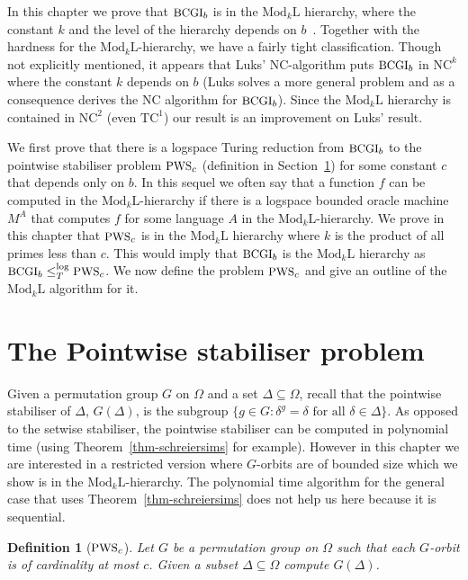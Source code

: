 \documentclass[11pt]{madras}%
\newtheorem{definition}[theorem]{Definition}
\theoremstyle{remark}
\newcommand{\ModkL}[1]{{\ensuremath{\mathrm{Mod}_{#1}\mathrm{L}}}}
\newcommand{\ProblemFont}[1]{{\ensuremath{\textrm{\small #1}}}}
\newcommand{\pointwise}[2]{{\ensuremath{#1\left(#2\right)}}}
\begin{document}
In this chapter we prove that $\ProblemFont{BCGI}_b$ is in the
$\ModkL{k}$ hierarchy, where the constant $k$ and the level of the
hierarchy depends on $b$~\cite{arvind2005bounded}. Together with the
hardness for the $\ModkL{k}$-hierarchy, we have a fairly tight
classification.  Though not explicitly mentioned, it appears that
Luks' $\mathrm{NC}$-algorithm puts $\ProblemFont{BCGI}_b$ in
$\mathrm{NC}^k$ where the constant $k$ depends on $b$ (Luks solves a
more general problem and as a consequence derives the $\mathrm{NC}$
algorithm for $\ProblemFont{BCGI}_b$).  Since the $\ModkL{k}$
hierarchy is contained in $\mathrm{NC}^2$ (even $\mathrm{TC}^1$) our
result is an improvement on Luks' result.

We first prove that there is a logspace Turing reduction from
$\ProblemFont{BCGI}_b$ to the pointwise stabiliser problem
$\ProblemFont{PWS}_c$ (definition in Section~\ref{sect-pws}) for some
constant $c$ that depends only on $b$. In this sequel we often say
that a function $f$ can be computed in the $\ModkL{k}$-hierarchy if
there is a logspace bounded oracle machine $M^A$ that computes $f$ for
some language $A$ in the $\ModkL{k}$-hierarchy. We prove in this
chapter that $\ProblemFont{PWS}_c$ is in the $\ModkL{k}$ hierarchy
where $k$ is the product of all primes less than $c$. This would imply
that $\ProblemFont{BCGI}_b$ is the $\ModkL{k}$ hierarchy as
$\ProblemFont{BCGI}_b \leq_{T}^{\log} \ProblemFont{PWS}_c$.  We now
define the problem $\ProblemFont{PWS}_c$ and give an outline of the
$\ModkL{k}$ algorithm for it.

\section{The Pointwise stabiliser problem}\label{sect-pws}

Given a permutation group $G$ on $\Omega$ and a set $\Delta \subseteq
\Omega$, recall that the pointwise stabiliser of $\Delta$,
$\pointwise{G}{\Delta}$, is the subgroup $\{ g \in G : \delta^g =
\delta \textrm{ for all }\delta \in \Delta \}$. As opposed to the
setwise stabiliser, the pointwise stabiliser can be computed in
polynomial time (using Theorem~\ref{thm-schreiersims} for example).
However in this chapter we are interested in a restricted version
where $G$-orbits are of bounded size which we show is in the
$\ModkL{k}$-hierarchy.  The polynomial time algorithm for the general
case that uses Theorem~\ref{thm-schreiersims} does not help us here
because it is sequential.

\begin{definition}[$\ProblemFont{PWS}_c$]
  Let $G$ be a permutation group on $\Omega$ such that each $G$-orbit
  is of cardinality at most $c$. Given a subset $\Delta \subseteq
  \Omega$ compute $\pointwise{G}{\Delta}$.
\end{definition}
\end{document}
